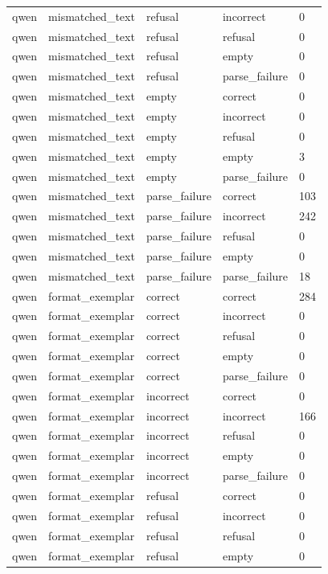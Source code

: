 \begin{tabular}{lllll}
qwen & mismatched\_text & refusal & incorrect & 0 \\
qwen & mismatched\_text & refusal & refusal & 0 \\
qwen & mismatched\_text & refusal & empty & 0 \\
qwen & mismatched\_text & refusal & parse\_failure & 0 \\
qwen & mismatched\_text & empty & correct & 0 \\
qwen & mismatched\_text & empty & incorrect & 0 \\
qwen & mismatched\_text & empty & refusal & 0 \\
qwen & mismatched\_text & empty & empty & 3 \\
qwen & mismatched\_text & empty & parse\_failure & 0 \\
qwen & mismatched\_text & parse\_failure & correct & 103 \\
qwen & mismatched\_text & parse\_failure & incorrect & 242 \\
qwen & mismatched\_text & parse\_failure & refusal & 0 \\
qwen & mismatched\_text & parse\_failure & empty & 0 \\
qwen & mismatched\_text & parse\_failure & parse\_failure & 18 \\
qwen & format\_exemplar & correct & correct & 284 \\
qwen & format\_exemplar & correct & incorrect & 0 \\
qwen & format\_exemplar & correct & refusal & 0 \\
qwen & format\_exemplar & correct & empty & 0 \\
qwen & format\_exemplar & correct & parse\_failure & 0 \\
qwen & format\_exemplar & incorrect & correct & 0 \\
qwen & format\_exemplar & incorrect & incorrect & 166 \\
qwen & format\_exemplar & incorrect & refusal & 0 \\
qwen & format\_exemplar & incorrect & empty & 0 \\
qwen & format\_exemplar & incorrect & parse\_failure & 0 \\
qwen & format\_exemplar & refusal & correct & 0 \\
qwen & format\_exemplar & refusal & incorrect & 0 \\
qwen & format\_exemplar & refusal & refusal & 0 \\
qwen & format\_exemplar & refusal & empty & 0 \\

\end{tabular}

